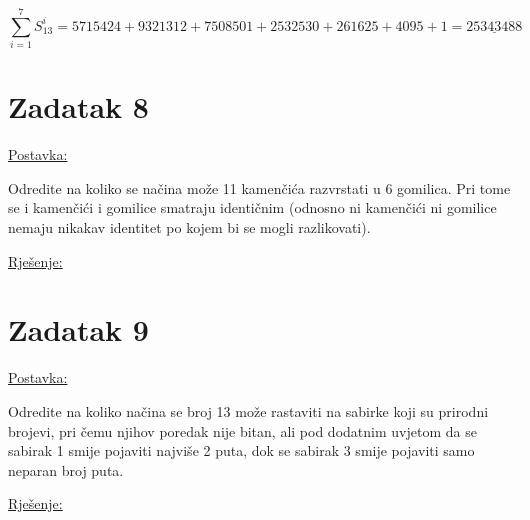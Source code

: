 \documentclass[12pt]{article}
\begin{document}
$$\sum_{i=1}^7 S_{13}^i = 5715424 + 9321312 +  7508501 + 2532530 + 261625 + 4095 + 1 = \underline{25343488}$$

\newpage
\section*{Zadatak 8\label{Z8}}	 

\underline{Postavka:}

Odredite na koliko se načina može 11 kamenčića razvrstati u 6 gomilica. Pri tome se i kamenčići i gomilice smatraju identičnim (odnosno ni kamenčići ni gomilice nemaju nikakav identitet po kojem bi se mogli razlikovati).

\underline{Rješenje:}\\

\newpage
\section*{Zadatak 9\label{Z9}}	 

\underline{Postavka:}

Odredite na koliko načina se broj 13 može rastaviti na sabirke koji su prirodni brojevi, pri čemu njihov poredak nije bitan, ali pod dodatnim uvjetom da se sabirak 1 smije pojaviti najviše 2 puta, dok se sabirak 3 smije pojaviti samo neparan broj puta.

\underline{Rješenje:}\\
\end{document}

